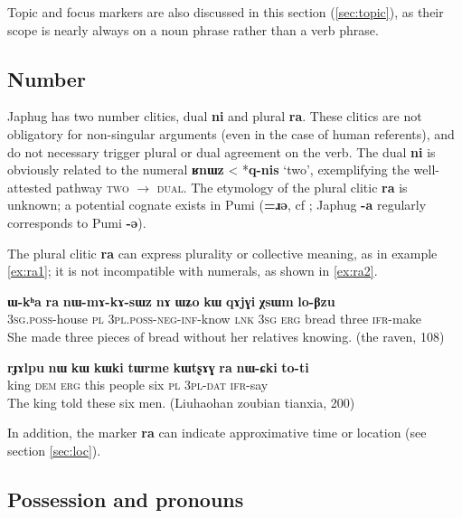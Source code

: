 \documentclass[oldfontcommands,oneside,a4paper,11pt]{article}
\newcommand{\ipa}[1]{\mbox{\phon\textbf{#1}}} %
\begin{document}
Topic and focus markers are also discussed in this section (\ref{sec:topic}), as their scope is nearly always on a noun phrase rather than a verb phrase.

\subsection{Number} \label{sec:number}

Japhug has two number clitics, dual \ipa{ni} and plural \ipa{ra}. These clitics are not obligatory for non-singular arguments (even in the case of human referents), and do not necessary trigger plural or dual agreement on the verb. The dual \ipa{ni} is obviously related to the numeral \ipa{ʁnɯz} < *\ipa{q-nis} `two', exemplifying the well-attested pathway \textsc{two} $\rightarrow$ \textsc{dual}. The etymology of the plural clitic \ipa{ra} is unknown; a potential cognate exists in Pumi (\ipa{=ɹə}, cf \citealt[135]{daudey14grammar}; Japhug \ipa{-a} regularly corresponds to Pumi \ipa{-ə}).
 
  The plural clitic \ipa{ra} can express plurality or collective meaning, as in example \ref{ex:ra1}; it is not incompatible with numerals, as shown in \ref{ex:ra2}.
 
\begin{exe}
\ex \label{ex:ra1}
\gll \ipa{ɯ-kʰa} 	\ipa{ra} 	\ipa{nɯ-mɤ-kɤ-sɯz} 	\ipa{nɤ} 	\ipa{ɯʑo} 	\ipa{kɯ} 	\ipa{qɤjɣi} 	\ipa{χsɯm} 	\ipa{lo-βzu} \\
\textsc{3sg.poss}-house \textsc{pl} \textsc{3pl.poss-neg-inf}-know \textsc{lnk} \textsc{3sg} \textsc{erg} bread three \textsc{ifr}-make \\
\glt She made three pieces of bread without her relatives knowing. (the raven, 108)
\end{exe}

\begin{exe}
\ex \label{ex:ra2}
\gll 
 \ipa{rɟɤlpu} 	\ipa{nɯ} 	\ipa{kɯ} 	\ipa{kɯki} 	\ipa{tɯrme} 	\ipa{kɯtʂɤɣ} 	\ipa{ra} 	\ipa{nɯ-ɕki}  	\ipa{to-ti} \\
 king \textsc{dem} \textsc{erg} this people six \textsc{pl} \textsc{3pl-dat} \textsc{ifr}-say  \\
 \glt The king told these six men. (Liuhaohan zoubian tianxia, 200)
\end{exe}

In addition, the marker \ipa{ra} can indicate approximative time or location  (see section  \ref{sec:loc}).
 


 \subsection{Possession and pronouns} \label{sec:pronouns}
 
\end{document}
